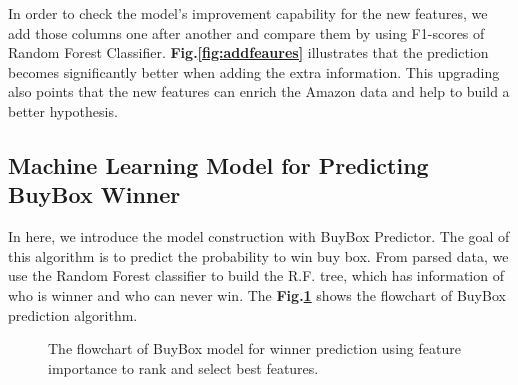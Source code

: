 %

In order to check the model's improvement capability for the new features, we add those columns one after another and compare them by using F1-scores of Random Forest Classifier. \textbf{Fig.\ref{fig:addfeaures}} illustrates that the prediction becomes significantly better when adding the extra information. 
This upgrading also points that the new features can enrich the Amazon data and help to build a better hypothesis.

\subsection{Machine Learning Model for Predicting BuyBox Winner}
\label{sec:buyboxmodel}

In here, we introduce the model construction with BuyBox Predictor. The goal of this algorithm is to predict the probability to win buy box. From parsed data, we use the Random Forest classifier to build the R.F. tree, which has information of who is winner and who can never win. The \textbf{Fig.\ref{fig:buyboxflow}} shows the flowchart of BuyBox prediction algorithm.

\begin{figure}[!h]
	\begin{center}
	\end{center}
	\caption{\label{fig:buyboxflow}The flowchart of BuyBox model for winner prediction using feature importance to rank and select best features.}
\end{figure}

